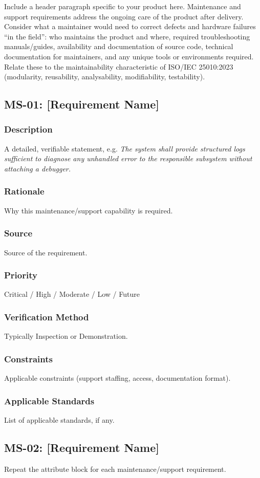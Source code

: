 Include a header paragraph specific to your product here. Maintenance and support requirements address the ongoing care of the product after delivery. Consider what a maintainer would need to correct defects and hardware failures ``in the field'': who maintains the product and where, required troubleshooting manuals/guides, availability and documentation of source code, technical documentation for maintainers, and any unique tools or environments required. Relate these to the maintainability characteristic of ISO/IEC 25010:2023 \cite{ISO25010} (modularity, reusability, analysability, modifiability, testability).

\subsection{MS-01: [Requirement Name]}
\subsubsection{Description}
A detailed, verifiable statement, e.g. \textit{The system shall provide structured logs sufficient to diagnose any unhandled error to the responsible subsystem without attaching a debugger.}
\subsubsection{Rationale}
Why this maintenance/support capability is required.
\subsubsection{Source}
Source of the requirement.
\subsubsection{Priority}
Critical / High / Moderate / Low / Future
\subsubsection{Verification Method}
Typically Inspection or Demonstration.
\subsubsection{Constraints}
Applicable constraints (support staffing, access, documentation format).
\subsubsection{Applicable Standards}
List of applicable standards, if any.

\subsection{MS-02: [Requirement Name]}
Repeat the attribute block for each maintenance/support requirement.
